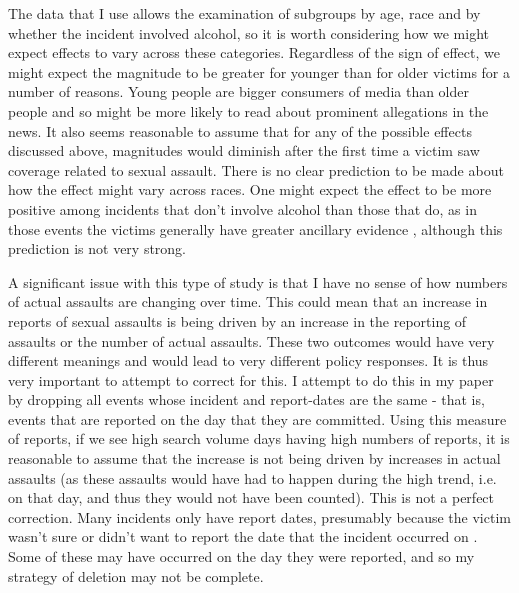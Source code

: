\documentclass[AER,draftmode]{AEA}
\begin{document}
The data that I use allows the examination of subgroups by age, race and by whether the incident involved alcohol, so it is worth considering how we might expect effects to vary across these categories. Regardless of the sign of effect, we might expect the magnitude to be greater for younger than for older victims for a number of reasons. Young people are bigger consumers of media than older people  and so might be more likely to read about prominent allegations in the news. It also seems reasonable to assume that for any of the possible effects discussed above, magnitudes would diminish after the first time a victim saw coverage related to sexual assault.  There is no clear prediction to be made about how the effect might vary across races. One might expect the effect to be more positive among incidents that don't involve alcohol than those that do, as in those events the victims generally have greater ancillary evidence \cite{allen_reporting_2007}, although this prediction is not very strong. 

A significant issue with this type of study is that I have no sense of how numbers of actual assaults are changing over time. This could mean that an increase in reports of sexual assaults is being driven by an increase in the reporting of assaults or the number of actual assaults. These two outcomes would have very different meanings and would lead to very different policy responses. It is thus very important to attempt to correct for this. I attempt to do this in my paper by dropping all events whose incident and report-dates are the same - that is, events that are reported on the day that they are committed. Using this measure of reports, if we see high search volume days having high numbers of reports, it is reasonable to assume that the increase is not being driven by increases in actual assaults (as these assaults would have had to happen during the high trend, i.e. on that day, and thus they would not have been counted). This is not a perfect correction. Many incidents only have report dates, presumably because the victim wasn't sure or didn't want to report the date that the incident occurred on . Some of these may have occurred on the day they were reported, and so my strategy of deletion may not be complete.
\end{document}
